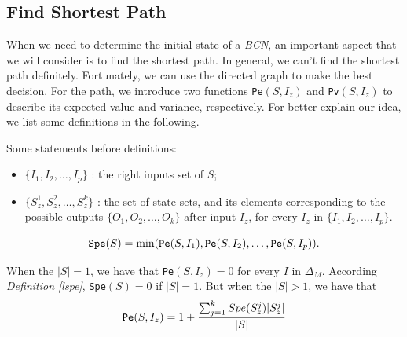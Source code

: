 \subsection{Find Shortest Path}
When we need to determine the initial state of a {\em BCN}, an important aspect that we will consider is to find the shortest path. In general, we can't find the shortest path definitely.  Fortunately, we can use the directed graph to make the best decision. For the path, we introduce two functions {\tt Pe}$(S, I_z)$ and {\tt Pv}$(S, I_z)$ to describe its expected value and variance, respectively. For better explain our idea, we list some definitions in the following.



Some statements before definitions:
\begin{itemize}
  \item $\{I_1,I_2,\ldots, I_p\}$ : the right inputs set of $S$;
  \item $\{S_z^1,S_z^2,\ldots, S_z^k\}$ : the set of state sets, and its elements corresponding to the possible outputs $\{O_1,O_2,\ldots,O_k\}$ after input $I_z$, for every $I_z$ in $\{I_1,I_2,\ldots, I_p\}$.
\end{itemize} 
\begin{definition}[{\tt Spe}$(S)$] \label{lspe}
 \[{\tt Spe}(S)= \min({\tt Pe}(S, I_1),{\tt Pe}(S, I_2),\ldots,{\tt Pe}(S, I_p)).\] 
\end{definition}

\begin{definition}[{\tt Pe}$(S, I_z)$] 
When the $|S|=1$, we have that
{\tt Pe}$(S, I_z)=0$  for every $I$ in $\Delta_M$. According {\em Definition \ref{lspe}}, {\tt Spe}$(S)=0$ if $|S|=1$. But when the $|S|>1$, 
we have that  
\[{\tt Pe}(S, I_z)=1 +\frac{\sum_{j=1}^k Spe(S_z^j)|S_z^j|}{ |S|}\] 
\end{definition}

